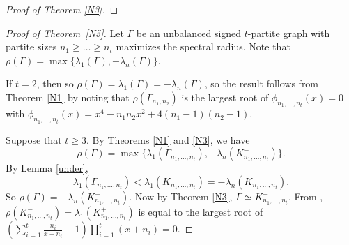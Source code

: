 \documentclass[10pt,a4paper]{amsart}
\numberwithin{equation}{section}
\begin{document}
\begin{proof} [Proof of Theorem \ref{N3}]
\end{proof}



\begin{proof}[Proof of Theorem~\ref{N5}] 
Let $\Gamma$ be an unbalanced signed $t$-partite graph with partite sizes $n_1\ge \dots\ge n_t$ maximizes the spectral radius. 
Note that $\rho(\Gamma)=\max\{\lambda_1(\Gamma), -\lambda_n(\Gamma)\}$. 

If $t=2$, then  %
so  $\rho(\Gamma)=\lambda_1(\Gamma)=-\lambda_n(\Gamma)$,  so the result follows from Theorem \ref{N1} by noting that $\rho(\Gamma_{n_1,n_2})$ is the largest root of $\phi_{n_1,\dots,n_t}(x)=0$ with $\phi_{n_1,\dots,n_t}(x)=x^4-n_1n_2x^2+4(n_1-1)(n_2-1)$.


Suppose  that $t\ge 3$. 
By Theorems \ref{N1} and \ref{N3}, we have 
\[
\rho(\Gamma)=\max\{\lambda_1(\Gamma_{n_1, \dots,  n_t}), -\lambda_n(K_{n_1, \dots, n_t}^-)\}.
\] 
By Lemma \ref{under},  
\[
\lambda_1(\Gamma_{n_1, \dots, n_t})<\lambda_1(K_{n_1, \dots, n_t}^+)=-\lambda_n(K_{n_1, \dots, n_t}^-). 
\]
So $\rho(\Gamma)=-\lambda_n(K_{n_1, \dots, n_t}^-)$. Now by Theorem \ref{N3}, $\Gamma\simeq K_{n_1, \dots, n_t}^-$. From \cite{De,EH}, 
$\rho(K_{n_1, \dots, n_t}^-)=\lambda_1(K_{n_1, \dots, n_t}^+)$ is equal to the largest root of $\left(\sum_{i=1}^t\frac{n_i}{x+n_i}-1\right)\prod_{i=1}^t(x+n_i)=0$.%
\end{proof}
\end{document}
